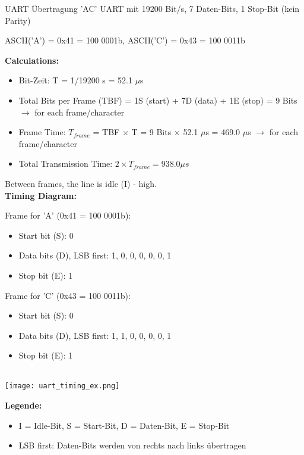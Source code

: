 \begin{example2}{UART Übertragung 'AC'}
    UART mit 19200 Bit/s, 7 Daten-Bits, 1 Stop-Bit (kein Parity)

    ASCII('A') = 0x41 = 100 0001b, ASCII('C') = 0x43 = 100 0011b
    
    \tcblower
    \textbf{Calculations:}
    \begin{itemize}
        \item Bit-Zeit: T = 1/19200 s = 52.1 $\mu$s
        \item Total Bits per Frame (TBF) = 1S (start) + 7D (data) + 1E (stop) = 9 Bits $\rightarrow$ for each frame/character
        \item Frame Time: $T_{frame}$ = TBF $\times$ T = 9 Bits $\times$ 52.1 $\mu$s = 469.0 $\mu$s $\rightarrow$ for each frame/character
        \item Total Transmission Time: $2 \times T_{frame} = 938.0 \mu s$
    \end{itemize}
    Between frames, the line is idle (I) - high.
    \vspace{1mm}\\
    \textbf{Timing Diagram:}
    \vspace{1mm}\\
    \begin{minipage}{0.5\linewidth}
    Frame for 'A' (0x41 = 100 0001b):
    \begin{itemize}
        \item Start bit (S): 0
        \item Data bits (D), LSB first: 1, 0, 0, 0, 0, 0, 1
        \item Stop bit (E): 1
    \end{itemize}
    \end{minipage}
    \begin{minipage}{0.5\linewidth}
    Frame for 'C' (0x43 = 100 0011b):
    \begin{itemize}
        \item Start bit (S): 0
        \item Data bits (D), LSB first: 1, 1, 0, 0, 0, 0, 1
        \item Stop bit (E): 1
    \end{itemize}
    \end{minipage}
    \vspace{1mm}\\
    \texttt{[image: uart\_timing\_ex.png]}
    
    \textbf{Legende:}
    \begin{itemize}
        \item I = Idle-Bit, S = Start-Bit, D = Daten-Bit, E = Stop-Bit
        \item LSB first: Daten-Bits werden von rechts nach links übertragen
    \end{itemize}
    

\end{example2}
